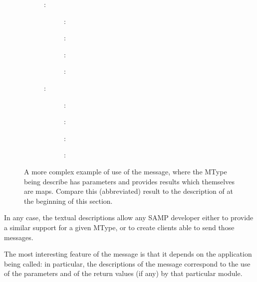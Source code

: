 \begin{figure}[tbp]
\begin{minipage}{\columnwidth}
\begin{small}
\begin{description}
\begin{description}
\begin{description}
							\item[]:
							\begin{description}
								\item[]:
								\item[]:
								\item[]:
								\item[]:
							\end{description}
							
							\item[]:
							\begin{description}
								\item[]:
								\item[]:
								\item[]:
								\item[]:
							\end{description}
						\end{description}
						
					\end{description}
				\end{description}
				\end{small}
			\end{minipage}
			\caption[Verbose description of the
			 method.]
			{
				A more complex example of use of the
				 message, where the
				MType being describe has parameters and provides
				results which themselves are maps. Compare this
				(abbreviated) result to the description of
				 at the beginning of
				this section.
			}
			\label{fig:describeSelf}
		\end{figure}
		
		In any case, the textual descriptions allow any SAMP
		developer either to provide a similar support for a
		given MType, or to create clients able to send those
		messages.
		
		The most interesting feature of the
		 message is that it depends
		on the application being called: in particular, the
		descriptions of the message correspond to the use of the
		parameters and of the return values (if any) by that
		particular module.
		

